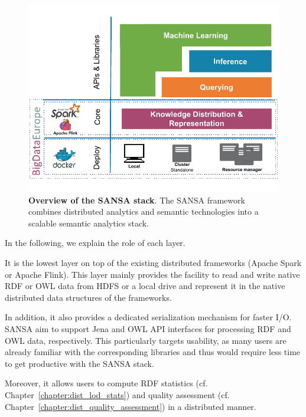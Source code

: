 \begin{figure}
\centering 
	\includegraphics[width=0.95\columnwidth]{images/7_implemenation_and_usecases/sansa-architecture.pdf}
	\caption{\textbf{Overview of the SANSA stack}.
	The SANSA framework combines distributed analytics and semantic technologies into a scalable semantic analytics stack.}
	\label{fig:imp-use-cases-sansa-architecture}
\end{figure}

In the following, we explain the role of each layer.

It is the lowest layer on top of the existing distributed frameworks (Apache Spark or Apache Flink).
This layer mainly provides the facility to read and write native \gls{RDF} or \gls{OWL} data from \gls{HDFS} or a local drive and represent it in the native distributed data structures of the frameworks.

In addition, it also provides a dedicated serialization mechanism for faster I/O. 
SANSA aim to support Jena and \gls{OWL} \gls{API} interfaces for processing \gls{RDF} and \gls{OWL} data, respectively.
This particularly targets usability, as many users are already familiar with the corresponding libraries and thus would require less time to get productive with the SANSA stack.

Moreover, it allows users to compute \gls{RDF} statistics (cf. Chapter~\ref{chapter:dist_lod_stats}) and quality assessment (cf. Chapter~\ref{chapter:dist_quality_assessment}) in a distributed manner.

